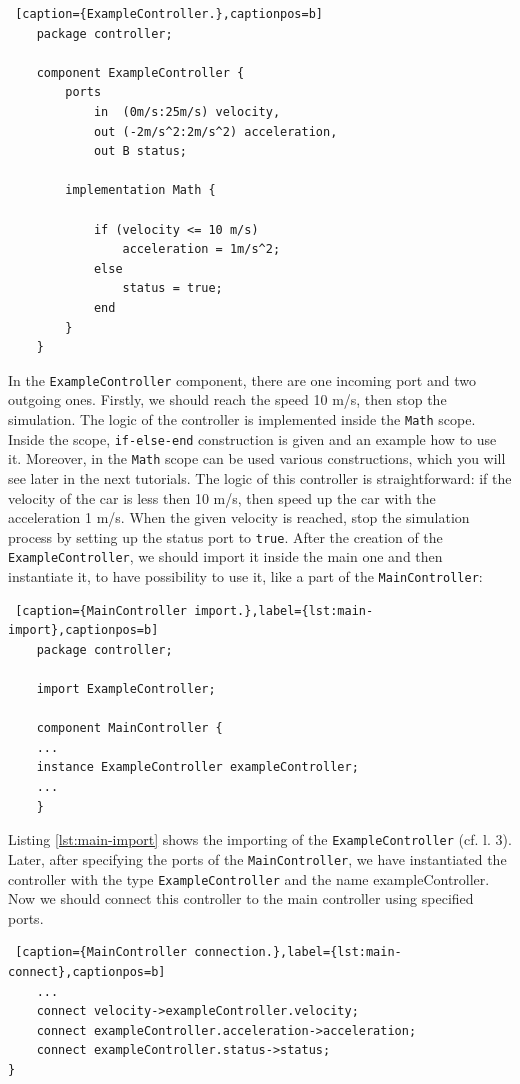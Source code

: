 \bigskip
\begin{lstlisting} [caption={ExampleController.},captionpos=b]
    package controller;

    component ExampleController {
	    ports
		    in  (0m/s:25m/s) velocity,
		    out (-2m/s^2:2m/s^2) acceleration,
		    out B status;

	    implementation Math {
		
		    if (velocity <= 10 m/s)
    	        acceleration = 1m/s^2;
    	    else
    	    	status = true;
            end
	    }
    }
\end{lstlisting}
\bigskip
In the \texttt{ExampleController} component, there are one incoming port and two outgoing ones. Firstly, we should reach the speed 10 m/s, then stop the simulation. The logic of the controller is implemented inside the \texttt{Math} scope. Inside the scope, \texttt{if-else-end} construction is given and an example how to use it. Moreover, in the \texttt{Math} scope can be used various constructions, which you will see later in the next tutorials. The logic of this controller is straightforward: if the velocity of the car is less then 10 m/s, then speed up the car with the acceleration 1 m/s. When the given velocity is reached, stop the simulation process by setting up the status port to \texttt{true}. \newline
After the creation of the \texttt{ExampleController}, we should import it inside the main one and then instantiate it, to have possibility to use it, like a part of the \texttt{MainController}:
\bigskip
\begin{lstlisting} [caption={MainController import.},label={lst:main-import},captionpos=b]
    package controller;

    import ExampleController;

    component MainController { 
    ...
    instance ExampleController exampleController;
    ...
    }
\end{lstlisting}
\bigskip
Listing \ref{lst:main-import} shows the importing of the \texttt{ExampleController} (cf. l. 3). Later, after specifying the ports of the \texttt{MainController}, we have instantiated the controller with the type \texttt{ExampleController} and the name exampleController. Now we should connect this controller to the main controller using specified ports.
\bigskip
\begin{lstlisting} [caption={MainController connection.},label={lst:main-connect},captionpos=b]
    ...
    connect velocity->exampleController.velocity;
    connect exampleController.acceleration->acceleration;
    connect exampleController.status->status;
}
\end{lstlisting}
